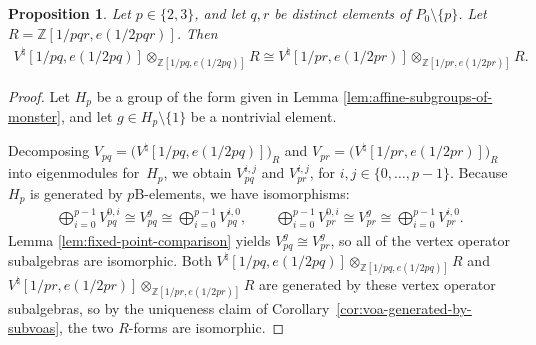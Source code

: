 \documentclass[11pt]{article}
\newcommand{\bZ}{\mathbb{Z}}
\newtheorem{prop}[thm]{Proposition}
\theoremstyle{definition}
\begin{document}
\begin{prop} \label{prop:isomorphisms-of-forms-for-2-and-3}Let $p \in \{2,3\}$, and let $q,r$ be distinct elements of $P_0 \setminus \{p\}$. Let $R = \bZ[1/pqr, e(1/2pqr)]$. Then
\begin{gather*} V^\natural[1/pq, e(1/2pq)] \otimes_{\bZ[1/pq, e(1/2pq)]} R \cong V^\natural[1/pr, e(1/2pr)] \otimes_{\bZ[1/pr, e(1/2pr)]} R. \end{gather*}
\end{prop}
\begin{proof}Let $H_p$ be a group of the form given in Lemma \ref{lem:affine-subgroups-of-monster}, and let $g \in H_p \setminus \{1\}$ be a nontrivial element.

Decomposing $V_{pq} = \big(V^\natural[1/pq,e(1/2pq)]\big)_R$ and $V_{pr} = \big(V^\natural[1/pr,e(1/2pr)]\big)_R$ into eigenmodules for~$H_p$, we obtain $V_{pq}^{i,j}$ and $V_{pr}^{i,j}$, for $i,j \in \{0,\ldots,p-1\}$. Because $H_p$ is generated by $p$B-elements, we have isomorphisms:
\begin{gather*}
\bigoplus_{i=0}^{p-1} V_{pq}^{0,i} \cong V_{pq}^g \cong \bigoplus_{i=0}^{p-1} V_{pq}^{i,0},\qquad
\bigoplus_{i=0}^{p-1} V_{pr}^{0,i} \cong V_{pr}^g \cong \bigoplus_{i=0}^{p-1} V_{pr}^{i,0}.
\end{gather*}
Lemma \ref{lem:fixed-point-comparison} yields $V_{pq}^g \cong V_{pr}^g$, so all of the vertex operator subalgebras are isomorphic. Both $V^\natural[1/pq, e(1/2pq)] \otimes_{\bZ[1/pq, e(1/2pq)]} R$ and $V^\natural[1/pr, e(1/2pr)] \otimes_{\bZ[1/pr, e(1/2pr)]} R$ are generated by these vertex operator subalgebras, so by the uniqueness claim of Corollary~\ref{cor:voa-generated-by-subvoas}, the two $R$-forms are isomorphic.
\end{proof}
\end{document}
